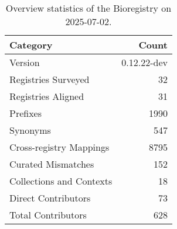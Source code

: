 \begin{table}
\caption{Overview statistics of the Bioregistry on 2025-07-02.}
\label{tab:bioregistry-summary}
\begin{tabular}{lr}
\toprule
Category & Count \\
\midrule
Version & 0.12.22-dev \\
Registries Surveyed & 32 \\
Registries Aligned & 31 \\
Prefixes & 1990 \\
Synonyms & 547 \\
Cross-registry Mappings & 8795 \\
Curated Mismatches & 152 \\
Collections and Contexts & 18 \\
Direct Contributors & 73 \\
Total Contributors & 628 \\
\bottomrule
\end{tabular}
\end{table}
